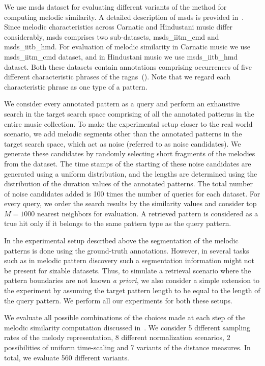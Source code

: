 We use \acrshort{msds} dataset for evaluating different variants of the method for computing melodic similarity. A detailed description of \acrshort{msds} is provided in~. Since melodic characteristics across Carnatic and Hindustani music differ considerably, \acrshort{msds} comprises two sub-datasets, \acrshort{msds_iitm_cmd} and \acrshort{msds_iitb_hmd}. For evaluation of melodic similarity in Carnatic music we use \acrshort{msds_iitm_cmd} dataset, and in Hindustani music we use \acrshort{msds_iitb_hmd} dataset. Both these datasets contain annotations comprising occurrences of five different characteristic phrases of the \glspl{raga}~(). Note that we regard each characteristic phrase as one type of a pattern.

We consider every annotated pattern as a query and perform an exhaustive search in the target search space comprising of all the annotated patterns in the entire music collection. To make the experimental setup closer to the real world scenario, we add melodic segments other than the annotated patterns in the target search space, which act as noise (referred to as noise candidates). We generate these candidates by randomly selecting short fragments of the melodies from the dataset. The time stamps of the starting of these noise candidates are generated using a uniform distribution, and the lengths are determined using the distribution of the duration values of the annotated patterns. The total number of noise candidates added is 100 times the number of queries for each dataset. For every query, we order the search results by the similarity values and consider top $M=1000$ nearest neighbors for evaluation. A retrieved pattern is considered as a true hit only if it belongs to the same pattern type as the query pattern. 

In the experimental setup described above the segmentation of the melodic patterns is done using the ground-truth annotations. However, in several tasks such as in melodic pattern discovery such a segmentation information might not be present for sizable datasets. Thus, to simulate a retrieval scenario where the pattern boundaries are not known \textit{a priori}, we also consider a simple extension to the experiment by assuming the target pattern length to be equal to the length of the query pattern. We perform all our experiments for both these setups. 

We evaluate all possible combinations of the choices made at each step of the melodic similarity computation discussed in~. We consider 5 different sampling rates of the melody representation, 8 different normalization scenarios, 2 possibilities of uniform time-scaling and 7 variants of the distance measures. In total, we evaluate 560 different variants.

